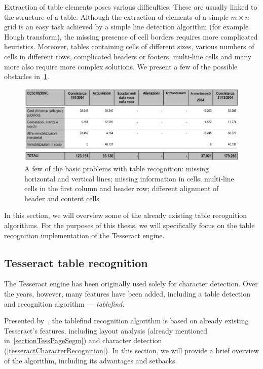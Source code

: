 Extraction of table elements poses various difficulties. These are usually linked to the structure of a table. Although the extraction of elements of a simple $m{\times}n$ grid is an easy task achieved by a simple line detection algorithm (for example Hough transform), the missing presence of cell borders requires more complicated heuristics. Moreover, tables containing cells of different sizes, various numbers of cells in different rows, complicated headers or footers, multi-line cells and many more also require more complex solutions. We present a few of the possible obstacles in~\cref{fig:tableRecognitionObstacles}.

\begin{figure}[t]
\centering
\includegraphics[width=0.7\linewidth]{img/tableDetection/recognitionProblematic.jpg}
\caption{A few of the basic problems with table recognition: missing horizontal and vertical lines; missing information in cells; multi-line cells in the first column and header row; different alignment of header and content cells }
\label{fig:tableRecognitionObstacles}
\end{figure}

In this section, we will overview some of the already existing table recognition algorithms. For the purposes of this thesis, we will specifically focus on the table recognition implementation of the Tesseract engine.

\subsection{Tesseract table recognition} \label{tableFind}

The Tesseract engine has been originally used solely for character detection. Over the years, however, many features have been added, including a table detection and recognition algorithm --- \emph{tablefind}.

Presented by~\citet{tableDetHeterogeneous}, the tablefind recognition algorithm is based on already existing Tesseract's features, including layout analysis (already mentioned in~\cref{sectionTessPageSegm}) and character detection (\cref{tesseractCharacterRecognition}). In this section, we will provide a brief overview of the algorithm, including its advantages and setbacks.

